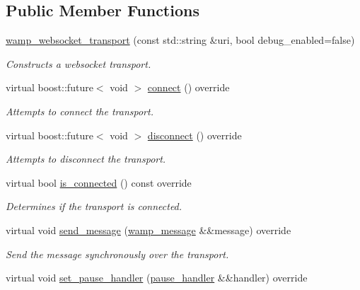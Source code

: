 \subsection*{Public Member Functions}
\begin{DoxyCompactItemize}
\item 
\hyperlink{classautobahn_1_1wamp__websocket__transport_a4f49ed26ca9614e26709dd3e469c9132}{wamp\+\_\+websocket\+\_\+transport} (const std\+::string \&uri, bool debug\+\_\+enabled=false)
\begin{DoxyCompactList}\small\item\em Constructs a websocket transport. \end{DoxyCompactList}\item 
virtual boost\+::future$<$ void $>$ \hyperlink{classautobahn_1_1wamp__websocket__transport_ac7415c55676df83dd76dd96a6bc35628}{connect} () override
\begin{DoxyCompactList}\small\item\em Attempts to connect the transport. \end{DoxyCompactList}\item 
virtual boost\+::future$<$ void $>$ \hyperlink{classautobahn_1_1wamp__websocket__transport_a7fa5bdb8c83811e354db2784e5991aa8}{disconnect} () override
\begin{DoxyCompactList}\small\item\em Attempts to disconnect the transport. \end{DoxyCompactList}\item 
virtual bool \hyperlink{classautobahn_1_1wamp__websocket__transport_aeedb36dcd8bca268dfc755802591faba}{is\+\_\+connected} () const override
\begin{DoxyCompactList}\small\item\em Determines if the transport is connected. \end{DoxyCompactList}\item 
virtual void \hyperlink{classautobahn_1_1wamp__websocket__transport_ac941e567680544f3c829d6f6de7cb999}{send\+\_\+message} (\hyperlink{classautobahn_1_1wamp__message}{wamp\+\_\+message} \&\&message) override
\begin{DoxyCompactList}\small\item\em Send the message synchronously over the transport. \end{DoxyCompactList}\item 
virtual void \hyperlink{classautobahn_1_1wamp__websocket__transport_a94a0e0555dc2929f07f4306d331b2c08}{set\+\_\+pause\+\_\+handler} (\hyperlink{classautobahn_1_1wamp__transport_a834b28db4d03bdb3ff77a4638cc2867d}{pause\+\_\+handler} \&\&handler) override

\end{DoxyCompactItemize}
